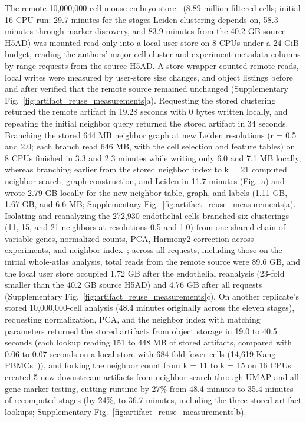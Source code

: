 The remote 10,000,000-cell mouse embryo store~\cite{qiu2024} (8.89 million filtered cells; initial 16-CPU run: 29.7 minutes for the stages Leiden clustering depends on, 58.3 minutes through marker discovery, and 83.9 minutes from the 40.2 GB source H5AD) was mounted read-only into a local user store on 8 CPUs under a 24 GiB budget, reading the authors' major cell-cluster and experiment metadata columns by range requests from the source H5AD. A store wrapper counted remote reads, local writes were measured by user-store size changes, and object listings before and after verified that the remote source remained unchanged (Supplementary Fig.~\ref{fig:artifact_reuse_measurements}a). Requesting the stored clustering returned the remote artifact in 19.28 seconds with 0 bytes written locally, and repeating the initial neighbor query returned the stored artifact in 34 seconds. Branching the stored 644 MB neighbor graph at new Leiden resolutions (r = 0.5 and 2.0; each branch read 646 MB, with the cell selection and feature tables) on 8 CPUs finished in 3.3 and 2.3 minutes while writing only 6.0 and 7.1 MB locally, whereas branching earlier from the stored neighbor index to k = 21 computed neighbor search, graph construction, and Leiden in 11.7 minutes (Fig.~a) and wrote 2.79 GB locally for the new neighbor table, graph, and labels (1.11 GB, 1.67 GB, and 6.6 MB; Supplementary Fig.~\ref{fig:artifact_reuse_measurements}a). Isolating and reanalyzing the 272,930 endothelial cells branched six clusterings (11, 15, and 21 neighbors at resolutions 0.5 and 1.0) from one shared chain of variable genes, normalized counts, PCA, Harmony2 correction across experiments, and neighbor index~\cite{korsunsky2019,patikas2026integration}; across all requests, including those on the initial whole-atlas analysis, total reads from the remote source were 89.6 GB, and the local user store occupied 1.72 GB after the endothelial reanalysis (23-fold smaller than the 40.2 GB source H5AD) and 4.76 GB after all requests (Supplementary Fig.~\ref{fig:artifact_reuse_measurements}c). On another replicate's stored 10,000,000-cell analysis (48.4 minutes originally across the eleven stages), requesting normalization, PCA, and the neighbor index with matching parameters returned the stored artifacts from object storage in 19.0 to 40.5 seconds (each lookup reading 151 to 448 MB of stored artifacts, compared with 0.06 to 0.07 seconds on a local store with 684-fold fewer cells (14,619 Kang PBMCs~\cite{kang2018})), and forking the neighbor count from k = 11 to k = 15 on 16 CPUs created 5 new downstream artifacts from neighbor search through UMAP and all-gene marker testing, cutting runtime by 27\% from 48.4 minutes to 35.4 minutes of recomputed stages (by 24\%, to 36.7 minutes, including the three stored-artifact lookups; Supplementary Fig.~\ref{fig:artifact_reuse_measurements}b).

